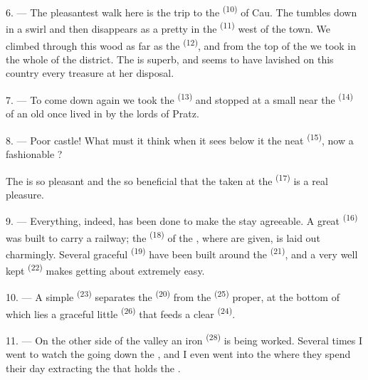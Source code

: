 \VUsaut{3.0mm}
\VUsaut{3.0mm}

6. --- The pleasantest walk here is the trip to the 
\textsuperscript{(10)} of Cau. The  tumbles down in a swirl and
then disappears as a pretty  in the 
\textsuperscript{(11)} west of the town. We climbed through this wood as far as
the  \textsuperscript{(12)}, and from the top of the
 we took in the whole  of the district. The
 is superb, and  seems to have lavished on
this country every treasure at her disposal.

7. --- To come down again we took the  \textsuperscript{(13)} and
stopped at a small  near the  \textsuperscript{(14)} of
an old  once lived in by the lords of Pratz.

8. --- Poor castle! What must it think when it sees below it the
neat  \textsuperscript{(15)}, now a fashionable
?

The  is so pleasant and the  so
beneficial that the  taken at the
 \textsuperscript{(17)} is a real pleasure.

\VUsaut{3.0mm}
\VUsaut{3.0mm}

9. --- Everything, indeed, has been done to make the stay agreeable. A
great  \textsuperscript{(16)} was built to carry a railway; the
 \textsuperscript{(18)} of the , where
 are given, is laid out charmingly. Several graceful
 \textsuperscript{(19)} have been built around the 
\textsuperscript{(21)}, and a very well kept  \textsuperscript{(22)} makes
getting about extremely easy.

10. --- A simple  \textsuperscript{(23)} separates the
 \textsuperscript{(20)} from the  \textsuperscript{(25)} proper,
at the bottom of which lies a graceful little  \textsuperscript{(26)}
that feeds a clear  \textsuperscript{(24)}.

11. --- On the other side of the valley an iron  \textsuperscript{(28)}
is being worked. Several times I went to watch the  going
down the , and I even went into the  where they
spend their day extracting the  that holds the .


